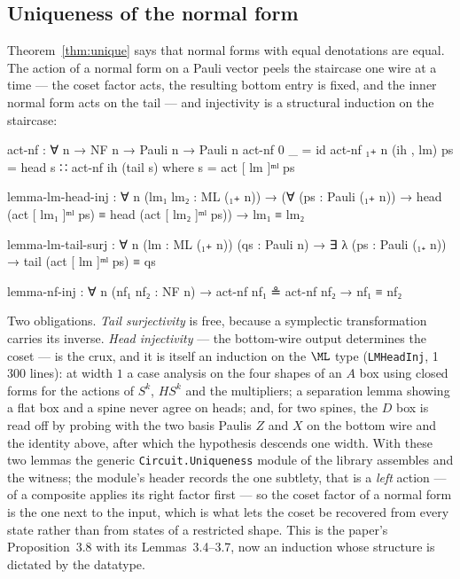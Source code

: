 \subsection{Uniqueness of the normal form}\label{sec:uniqueness}

Theorem~\ref{thm:unique} says that normal forms with equal denotations
are equal.  The action of a normal form on a Pauli vector peels the
staircase one wire at a time --- the coset factor acts, the resulting
bottom entry is fixed, and the inner normal form acts on the tail ---
and injectivity is a structural induction on the staircase:

\begin{agdacode}[basicstyle=\footnotesize\ttfamily]
act-nf : ∀ {n} → NF n → Pauli n → Pauli n
act-nf {0}    _        = id
act-nf {₁₊ n} (ih , lm) ps = head s ∷ act-nf ih (tail s)
  where s = act [ lm ]ᵐˡ ps

lemma-lm-head-inj : ∀ {n} (lm₁ lm₂ : ML (₁₊ n)) →
  (∀ (ps : Pauli (₁₊ n)) → head (act [ lm₁ ]ᵐˡ ps) ≡ head (act [ lm₂ ]ᵐˡ ps)) → lm₁ ≡ lm₂

lemma-lm-tail-surj : ∀ {n} (lm : ML (₁₊ n)) (qs : Pauli n) →
  ∃ λ (ps : Pauli (₁₊ n)) → tail (act [ lm ]ᵐˡ ps) ≡ qs

lemma-nf-inj : ∀ {n} (nf₁ nf₂ : NF n) → act-nf nf₁ ≗ act-nf nf₂ → nf₁ ≡ nf₂
\end{agdacode}

Two obligations.  \emph{Tail surjectivity} is free, because a
symplectic transformation carries its inverse.  \emph{Head injectivity}
--- the bottom-wire output determines the coset --- is the crux, and it
is itself an induction on the $\ML$ type (\texttt{LMHeadInj},
1\,300 lines): at width $1$ a case analysis on the four shapes of an
$A$ box using closed forms for the actions of $S^{k}$, $HS^{k}$ and the
multipliers; a separation lemma showing a flat box and a spine never
agree on heads; and, for two spines, the $D$ box is read off by probing
with the two basis Paulis $Z$ and $X$ on the bottom wire and the identity
above, after which the hypothesis descends one width.  With these two
lemmas the generic \texttt{Circuit.Uniqueness} module of the library
assembles  and the  witness;
the module's header records the one subtlety, that  is a
\emph{left} action ---  of a composite applies its right factor
first --- so the coset factor of a normal form is the one next to the
input, which is what lets the coset be recovered from every state rather
than from states of a restricted shape.  This is the paper's
Proposition~3.8 with its Lemmas~3.4--3.7, now an induction whose
structure is dictated by the datatype.

